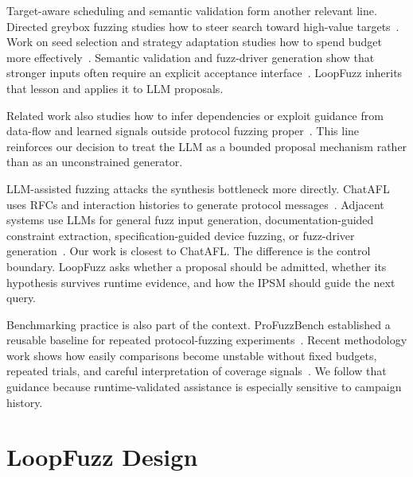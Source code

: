 \documentclass[conference]{IEEEtran}
\begin{document}
Target-aware scheduling and semantic validation form another relevant line. Directed greybox fuzzing studies how to steer search toward high-value targets~\cite{directed_greybox_fuzzing_2017,windranger_blocks_2022,when_analysis_2025}. Work on seed selection and strategy adaptation studies how to spend budget more effectively~\cite{seed_selection_successful_fuzzing_2021,one_fuzzing_strategy_rule_2022,regression_greybox_fuzzing_2021,efficient_errors_2022}. Semantic validation and fuzz-driver generation show that stronger inputs often require an explicit acceptance interface~\cite{one_engine_to_fuzz_em_all_2021,apicraft_fuzz_driver_2021}. LoopFuzz inherits that lesson and applies it to LLM proposals.

Related work also studies how to infer dependencies or exploit guidance from data-flow and learned signals outside protocol fuzzing proper~\cite{rulf_rust_library_fuzzing_2021,smartian_analyses_2021,magneto_step_wise_approach_2024}. This line reinforces our decision to treat the LLM as a bounded proposal mechanism rather than as an unconstrained generator.

LLM-assisted fuzzing attacks the synthesis bottleneck more directly. ChatAFL uses RFCs and interaction histories to generate protocol messages~\cite{chatafl}. Adjacent systems use LLMs for general fuzz input generation, documentation-guided constraint extraction, specification-guided device fuzzing, or fuzz-driver generation~\cite{fuzz4all_universal_fuzzing_large_2024,llmif_augmented_large_language_2024,matter_llm_specification_2024,docter_documentation_guided_fuzzing_2022,carpetfuzz_documentation_2023,prompt_fuzzing_fuzz_driver_2024}. Our work is closest to ChatAFL. The difference is the control boundary. LoopFuzz asks whether a proposal should be admitted, whether its hypothesis survives runtime evidence, and how the IPSM should guide the next query.

Benchmarking practice is also part of the context. ProFuzzBench established a reusable baseline for repeated protocol-fuzzing experiments~\cite{profuzzbench_benchmark_stateful_protocol_2021}. Recent methodology work shows how easily comparisons become unstable without fixed budgets, repeated trials, and careful interpretation of coverage signals~\cite{sok_prudent_evaluation_practices_2024,reliability_benchmarking_2022,many_stack_2022}. We follow that guidance because runtime-validated assistance is especially sensitive to campaign history.

\section{LoopFuzz Design}
\end{document}
